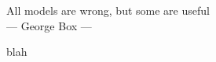 \thispagestyle{empty}

\vspace*{3cm}

\begin{center}
All models are wrong, but some are useful \\ \medskip
--- George Box ---   
\end{center}

\vspace{2cm}

blah